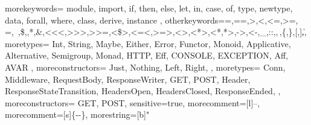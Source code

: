 {
  morekeywords={
    module,
    import,
    if,
    then,
    else,
    let,
    in,
    case,
    of,
    type,
    newtype,
    data,
    forall,
    where,
    class,
    derive,
    instance
  },
  otherkeywords={=,==,>,<,<=,>=,\\=,~,\$,\@,*,\&,<<<,>>>,>>=,<\$>,<=<,>=>,<>,<*>,<*,*>,->,<-,_,::,\(,\),\{,\},[,],\|},
  moretypes={
    Int,
    String,
    Maybe,
    Either,
    Error,
    Functor,
    Monoid,
    Applicative,
    Alternative,
    Semigroup,
    Monad,
    HTTP,
    Eff,
    CONSOLE,
    EXCEPTION,
    Aff,
    AVAR
  },
  moreconstructors={
    Just,
    Nothing,
    Left,
    Right,
  },
  moretypes={
    Conn,
    Middleware,
    RequestBody,
    ResponseWriter,
    GET,
    POST,
    Header,
    ResponseStateTransition,
    HeadersOpen,
    HeadersClosed,
    ResponseEnded,
  },
  moreconstructors={
    GET,
    POST,
  }
  sensitive=true,
  morecomment=[l]{--}, %
  morecomment=[s]{\{-}{-\}}, %
  morestring=[b]" %
}
